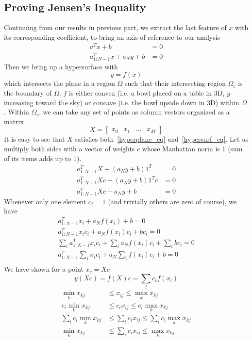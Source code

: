 \documentclass{article}
\numberwithin{equation}{subsection}
\begin{document}
\subsection{Proving Jensen's Inequality}
Continuing from our results in previous part, we extract the last feature of $x$ with its corresponding coefficient, to bring an axis of reference to our analysis
\begin{align}
    a^Tx+b &= 0\\
    a_{1:N-1}^Tx+a_Ny+b &= 0 \label{hyperplane_eq}
\end{align}
Then we bring up a hypersurface with 
\begin{equation}
    y=f(x) \label{hypersurf_eq}
\end{equation}
which intersects the plane in a region $\Omega$ such that their intersecting region $\Omega_c$ is the boundary of $\Omega$. $f$ is either convex (i.e. a bowl placed on a table in 3D, $y$ increasing toward the sky) or concave (i.e. the bowl upside down in 3D) within $\Omega$. Within $\Omega_c$, we can take any set of points as column vectors organized as a matrix
$$
X = \begin{bmatrix}
    x_0 & x_1 & ... & x_M
\end{bmatrix}
$$
It is easy to see that $X$ satisfies both~\ref{hyperplane_eq} and~\ref{hypersurf_eq}. Let us multiply both sides with a vector of weights $c$ whose Manhattan norm is 1 (sum of its items adds up to 1). 
\begin{align}
    a_{1:N-1}^TX+(a_Ny+b)1^T &= 0\\
    a_{1:N-1}^TXc+(a_Ny+b)1^Tc &= 0\\
    a_{1:N-1}^TXc+a_Ny+b &= 0
\end{align}
Whenever only one element $c_i=1$ (and trivially others are zero of course), we have
\begin{align}
    a_{1:N-1}^Tx_i+a_Nf(x_i)+b = 0\\
    a_{1:N-1}^Tx_ic_i+a_Nf(x_i)c_i+bc_i = 0\\
    \sum_i a_{1:N-1}^Tx_ic_i+\sum_i a_Nf(x_i)c_i+\sum_i bc_i = 0\\
    a_{1:N-1}^T\sum_i x_ic_i+a_N\sum_i f(x_i)c_i+b = 0\\
\end{align}
We have shown for a point $x_c=Xc$ 
\begin{equation}
    y(Xc)=f(X)c=\sum_i c_if(x_i)
\end{equation}
\begin{align}
    \min_kx_{kj} &\leq x_{ij} \leq \max_kx_{kj}\\
    c_i\min_kx_{kj} &\leq c_ix_{ij} \leq c_i\max_kx_{kj}\\
    \sum_i c_i\min_kx_{kj} &\leq \sum_i c_ix_{ij} \leq \sum_i c_i\max_kx_{kj}\\
    \min_kx_{kj} &\leq \sum_i c_ix_{ij} \leq \max_kx_{kj}\\
\end{align}
\end{document}
